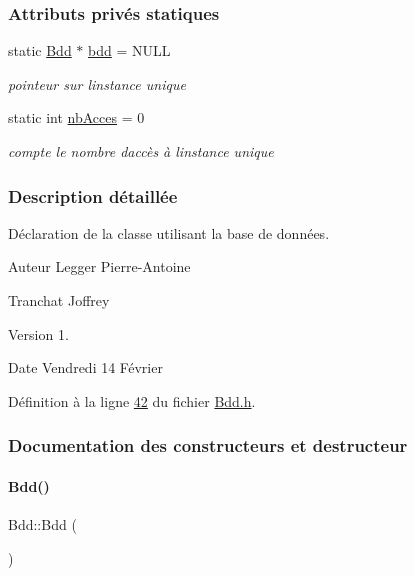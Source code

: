 \subsubsection*{Attributs privés statiques}
\begin{DoxyCompactItemize}
\item 
static \hyperlink{class_bdd}{Bdd} $\ast$ \hyperlink{class_bdd_a09bd3b3a31feedf3dd42a507e0249213}{bdd} = N\+U\+LL
\begin{DoxyCompactList}\small\item\em pointeur sur l\textquotesingle{}instance unique \end{DoxyCompactList}\item 
static int \hyperlink{class_bdd_a9fb6aa118a28c27307f27fd7662e462d}{nb\+Acces} = 0
\begin{DoxyCompactList}\small\item\em compte le nombre d\textquotesingle{}accès à l\textquotesingle{}instance unique \end{DoxyCompactList}\end{DoxyCompactItemize}


\subsubsection{Description détaillée}
Déclaration de la classe utilisant la base de données. 

\begin{DoxyAuthor}{Auteur}
Legger Pierre-\/\+Antoine 

Tranchat Joffrey
\end{DoxyAuthor}
\begin{DoxyVersion}{Version}
1.
\end{DoxyVersion}
\begin{DoxyDate}{Date}
Vendredi 14 Février 
\end{DoxyDate}


Définition à la ligne \hyperlink{_bdd_8h_source_l00042}{42} du fichier \hyperlink{_bdd_8h_source}{Bdd.\+h}.



\subsubsection{Documentation des constructeurs et destructeur}
\mbox{\label{class_bdd_a5306aeacb2baa3be8d4d3f8326527f60}} 
\paragraph{\texorpdfstring{Bdd()}{Bdd()}}
{\footnotesize\ttfamily Bdd\+::\+Bdd (\begin{DoxyParamCaption}{ }\end{DoxyParamCaption})\hspace{0.3cm}{\ttfamily [private]}}



